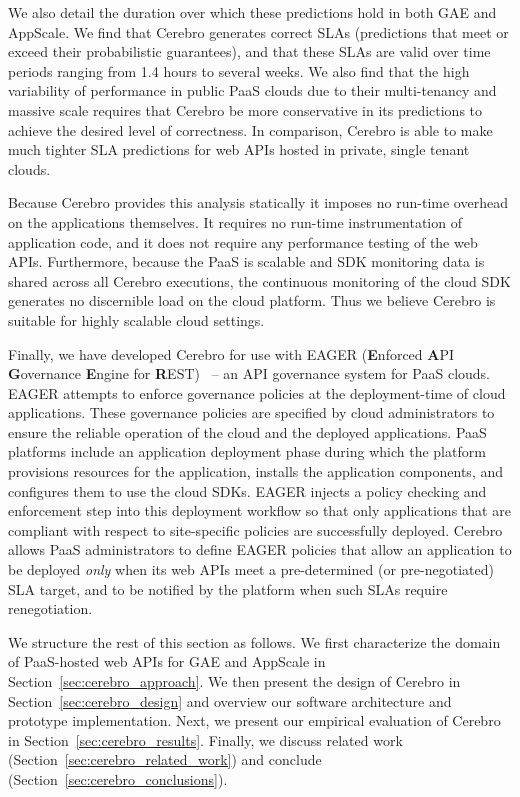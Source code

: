 We also detail the duration over which 
these predictions hold in both GAE and AppScale.  
We find that Cerebro generates correct SLAs (predictions that meet or exceed their
probabilistic guarantees), and that these SLAs are valid over time periods ranging
from 1.4 hours to several weeks.  
We also find that the high variability of performance in public PaaS clouds due to their multi-tenancy
and massive scale requires that Cerebro be more conservative in its predictions 
to achieve the desired level of correctness. In comparison, Cerebro is able to make
much tighter SLA predictions for web APIs hosted in private, single tenant clouds.

Because Cerebro provides this 
analysis statically it imposes no run-time overhead on the applications
themselves. It requires no run-time instrumentation of application code,
and it does not require any performance testing of the web APIs.
Furthermore, because the PaaS is scalable and SDK monitoring data is 
shared across all Cerebro executions, the continuous monitoring of the
cloud SDK generates no discernible load on the cloud platform.
Thus we believe Cerebro is suitable for highly scalable cloud
settings.

Finally, we have developed Cerebro for use with EAGER (\textbf{E}nforced
\textbf{A}PI \textbf{G}overnance \textbf{E}ngine for
\textbf{R}EST)~\cite{eager-fop15} --
an API governance system for PaaS clouds. EAGER attempts to enforce
governance policies at the deployment-time of cloud applications. These governance
policies are specified by cloud administrators to ensure the reliable
operation of the cloud and the deployed applications. PaaS
platforms include an application deployment phase during which the platform provisions
resources for the application, installs the application components, and
configures them to use the cloud SDKs. EAGER injects a policy checking and
enforcement step into this deployment workflow so that only applications that
are compliant with respect to site-specific policies are successfully deployed. 
Cerebro allows
PaaS administrators to define
EAGER policies that allow an application to be deployed \textit{only} when its
web APIs meet a pre-determined (or pre-negotiated) SLA target, and to be
notified by the platform when such SLAs require renegotiation.


We structure the rest of this section as follows.
We first characterize the domain of 
PaaS-hosted web APIs for GAE and AppScale 
in Section~\ref{sec:cerebro_approach}.   
We then present the design of Cerebro in Section~\ref{sec:cerebro_design}
and overview our software architecture and prototype implementation.
Next, we
present our empirical evaluation of Cerebro in 
Section~\ref{sec:cerebro_results}.
Finally,  we discuss related work (Section~\ref{sec:cerebro_related_work}) and 
conclude (Section~\ref{sec:cerebro_conclusions}).
